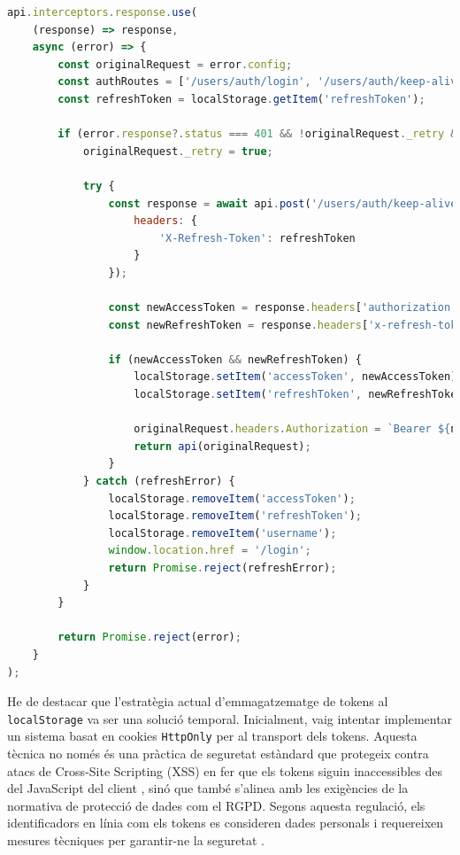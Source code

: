 \begin{lstlisting}[language=javascript, caption={Interceptor d'Axios per a la renovació automàtica de tokens a \texttt{api.ts}}]
api.interceptors.response.use(
    (response) => response,
    async (error) => {
        const originalRequest = error.config;
        const authRoutes = ['/users/auth/login', '/users/auth/keep-alive', '/users/auth/register'];
        const refreshToken = localStorage.getItem('refreshToken');

        if (error.response?.status === 401 && !originalRequest._retry && !authRoutes.includes(originalRequest.url) && refreshToken) {
            originalRequest._retry = true;

            try {
                const response = await api.post('/users/auth/keep-alive', null, {
                    headers: {
                        'X-Refresh-Token': refreshToken
                    }
                });

                const newAccessToken = response.headers['authorization']?.split(' ')[1];
                const newRefreshToken = response.headers['x-refresh-token'];

                if (newAccessToken && newRefreshToken) {
                    localStorage.setItem('accessToken', newAccessToken);
                    localStorage.setItem('refreshToken', newRefreshToken);

                    originalRequest.headers.Authorization = `Bearer ${newAccessToken}`;
                    return api(originalRequest);
                }
            } catch (refreshError) {
                localStorage.removeItem('accessToken');
                localStorage.removeItem('refreshToken');
                localStorage.removeItem('username');
                window.location.href = '/login';
                return Promise.reject(refreshError);
            }
        }

        return Promise.reject(error);
    }
);
\end{lstlisting}

He de destacar que l'estratègia actual d'emmagatzematge de tokens al \texttt{localStorage} va ser una solució temporal. Inicialment, vaig intentar implementar un sistema basat en cookies \texttt{HttpOnly} per al transport dels tokens. Aquesta tècnica no només és una pràctica de seguretat estàndard que protegeix contra atacs de Cross-Site Scripting (XSS) en fer que els tokens siguin inaccessibles des del JavaScript del client \cite{bitsrc_tokens_vs_cookies}, sinó que també s'alinea amb les exigències de la normativa de protecció de dades com el RGPD. Segons aquesta regulació, els identificadors en línia com els tokens es consideren dades personals i requereixen mesures tècniques per garantir-ne la seguretat \cite{gdpr_cookies}.

